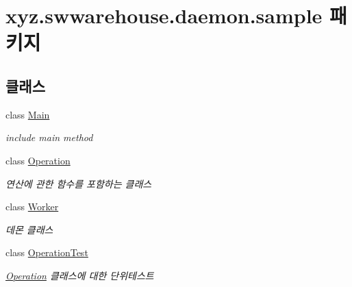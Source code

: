 \hypertarget{namespacexyz_1_1swwarehouse_1_1daemon_1_1sample}{\section{xyz.\-swwarehouse.\-daemon.\-sample 패키지}
\label{namespacexyz_1_1swwarehouse_1_1daemon_1_1sample}
}
\subsection*{클래스}
\begin{DoxyCompactItemize}
\item 
class \hyperlink{classxyz_1_1swwarehouse_1_1daemon_1_1sample_1_1_main}{Main}
\begin{DoxyCompactList}\small\item\em include main method \end{DoxyCompactList}\item 
class \hyperlink{classxyz_1_1swwarehouse_1_1daemon_1_1sample_1_1_operation}{Operation}
\begin{DoxyCompactList}\small\item\em 연산에 관한 함수를 포함하는 클래스 \end{DoxyCompactList}\item 
class \hyperlink{classxyz_1_1swwarehouse_1_1daemon_1_1sample_1_1_worker}{Worker}
\begin{DoxyCompactList}\small\item\em 데몬 클래스 \end{DoxyCompactList}\item 
class \hyperlink{classxyz_1_1swwarehouse_1_1daemon_1_1sample_1_1_operation_test}{Operation\-Test}
\begin{DoxyCompactList}\small\item\em \hyperlink{classxyz_1_1swwarehouse_1_1daemon_1_1sample_1_1_operation}{Operation} 클래스에 대한 단위테스트 \end{DoxyCompactList}\end{DoxyCompactItemize}
